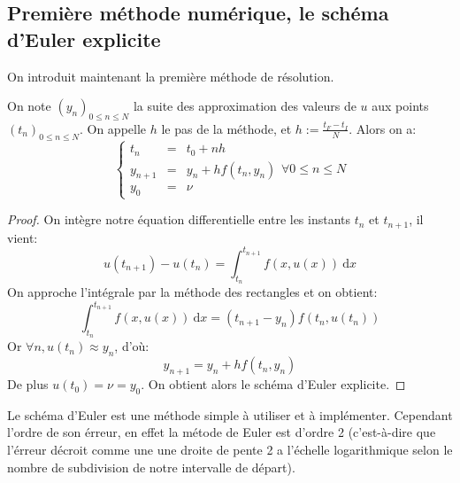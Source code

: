 \documentclass{article}
\newcommand{\cad}{c'est-\`a-dire }
\newtheorem[M , nocut]{prop}{Proposition}[section]
\newtheorem[M]{propt}{Propriété}[section]
\newtheorem[L , nocut]{thm}{Théoreme}
\newtheorem[L]{cor}{Corollaire}
\begin{document}
\subsection*{Première méthode numérique, le schéma d'Euler explicite}
On introduit maintenant la première méthode de résolution.
\begin{thm}
    On note $(y_n)_{0 \le n \le N}$ la suite des approximation des valeurs de $u$ aux points $(t_n)_{0 \le n \le N}$. On appelle $h$ le pas de la méthode, et $h:= \frac{t_F-t_I}{N}$. Alors on a:
    \[
        \left\{\begin{array}{rcl}
        t_n &=& t_0 + n h \\
        y_{n+1} &=& y_n + h f(t_n,y_n)\\
        y_0 &=& \nu
        \end{array}\right. \forall 0 \le n \le N
    \]
\end{thm}
\begin{proof}
    On intègre notre équation differentielle entre les instants $t_{n}$ et $t_{n+1}$, il vient:
    \[
      u(t_{n+1}) - u(t_n) = \int_{t_n}^{t_{n+1}} f(x,u(x))\ \mathrm{d}x
    \]
    On approche l'intégrale par la méthode des rectangles et on obtient:
    \[
        \int_{t_n}^{t_{n+1}} f(x,u(x))\ \mathrm{d}x = (t_{n+1}-y_n)f(t_n,u(t_n))
    \]Or $\forall n , u(t_n) \approx y_n $, d'où:
    \[
        y_{n+1} = y_n + h f(t_n,y_n)
    \]De plus $u(t_0) = \nu = y_0$. On obtient alors le schéma d'Euler explicite.
\end{proof}
Le schéma d'Euler est une méthode simple à utiliser et à implémenter. Cependant l'ordre de son érreur, en effet la métode de Euler est d'ordre 2 (\cad que l'érreur décroit comme une une droite de pente 2 a l'échelle logarithmique selon le nombre de subdivision de notre intervalle de départ). 
\end{document}
